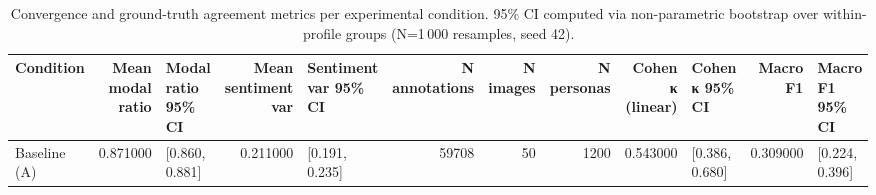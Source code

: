 \begin{table}
\caption{Convergence and ground-truth agreement metrics per experimental condition. 95\% CI computed via non-parametric bootstrap over within-profile groups (N=1\,000 resamples, seed 42).}
\label{tab:convergence_results}
\begin{tabular}{lrlrlrrrrlrl}
\toprule
Condition & Mean modal ratio & Modal ratio 95\% CI & Mean sentiment var & Sentiment var 95\% CI & N annotations & N images & N personas & Cohen κ (linear) & Cohen κ 95\% CI & Macro F1 & Macro F1 95\% CI \\
\midrule
Baseline (A) & 0.871000 & [0.860, 0.881] & 0.211000 & [0.191, 0.235] & 59708 & 50 & 1200 & 0.543000 & [0.386, 0.680] & 0.309000 & [0.224, 0.396] \\
\bottomrule
\end{tabular}
\end{table}
